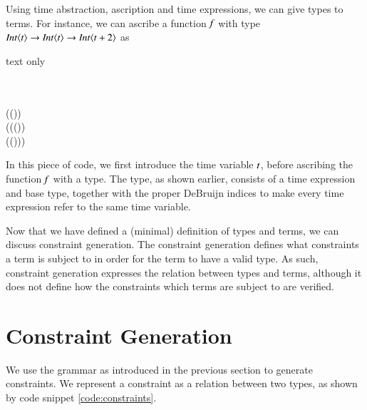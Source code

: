 Using time abstraction, ascription and time expressions, we can give types to terms. 
For instance, we can ascribe a function \ensuremath{\Varid{f}} with type \ensuremath{\Conid{Int}\langle\Varid{t}\rangle\to \Conid{Int}\langle\Varid{t}\rangle\to \Conid{Int}\langle\Varid{t}\mathbin{+}\mathrm{2}\rangle} as 
\begin{changemargin}{1cm}{0cm}
\begin{expansionno}{text only}
\begin{hscode}\SaveRestoreHook
{}%
%
%
%
%
%
%
%
\>[B]{}\;\<[13]%
\>[13]{}\mathbin{\$}{}\<[13E]%
\\
\>[B]{}\<[3]%
\>[3]{}\;{}\<[9]%
\>[9]{}\<[13]%
\>[13]{}\mathbin{\$}{}\<[13E]%
\\
\>[9]{}\;{}\<[16]%
\>[16]{}(\;\;(\;\;))\;{}\<[E]%
\\
\>[16]{}(\;{}\<[24]%
\>[24]{}(\;\;(\;\;))\;{}\<[E]%
\\
\>[24]{}(\;\;(\;\;))){}\<[E]%
\ColumnHook
\end{hscode}\resethooks
\end{expansionno}
\end{changemargin}

In this piece of code, we first introduce the time variable \ensuremath{\Varid{t}}, before ascribing the function \ensuremath{\Varid{f}} with a type.
The type, as shown earlier, consists of a time expression and base type, together with the proper DeBruijn indices to make every time expression refer to the same time variable.

Now that we have defined a (minimal) definition of types and terms, we can discuss constraint generation.
The constraint generation defines what constraints a term is subject to in order for the term to have a valid type.
As such, constraint generation expresses the relation between types and terms, although it does not define how the constraints which terms are subject to are verified.

\section{Constraint Generation}
We use the grammar as introduced in the previous section to generate constraints.
We represent a constraint as a relation between two types, as shown by code snippet \ref{code:constraints}.

